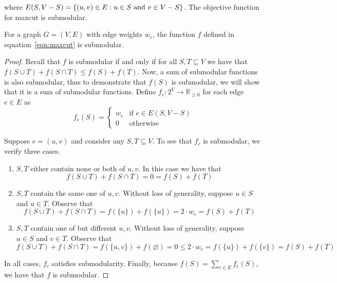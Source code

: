 \documentclass{article}
\begin{document}
where $E(S, V - S) = \{ (u, v) \in E: u \in S \textup{ and } v \in V - S \}$. The objective function for maxcut is submodular.
\begin{claim}
For a graph $G = (V, E)$ with edge weights $w_e$, the function $f$ defined in equation~\ref{eqn:maxcut} is submodular.
\end{claim}
\begin{proof}
Recall that $f$ is submodular if and only if for all $S, T \subseteq V$ we have that $f(S \cup T) + f(S \cap T) \leq f(S) + f(T)$. Now, a sum of submodular functions is also submodular, thus to demonstrate that $f(S)$ is submodular, we will show that it is a sum of submodular functions. Define $f_e: 2^V \rightarrow \mathbb{R}_{\geq 0}$ for each edge $e \in E$ as
\begin{equation*}
f_e(S) = \begin{cases}
w_e & \text{if } e \in E(S, V - S) \\
0 & \text{otherwise}
\end{cases}
\end{equation*}

Suppose $e = (u, v)$ and consider any $S, T \subseteq V$. To see that $f_e$ is submodular, we verify three cases.
\vspace{-1em}
\begin{enumerate}[1.]
\item $S, T$ either contain none or both of $u, v$. In this case we have that
\begin{equation*}
f(S \cup T) + f(S \cap T)
= 0
= f(S) + f(T)
\end{equation*}

\item $S, T$ contain the same one of $u, v$. Without loss of generality, suppose $u \in S$ and $u \in T$. Observe that
\begin{equation*}
f(S \cup T) + f(S \cap T)
= f(\{ u \}) + f(\{ u \})
= 2 \cdot w_e
= f(S) + f(T)
\end{equation*}

\item $S, T$ contain one of but different $u, v$. Without loss of generality, suppose $u \in S$ and $v \in T$. Observe that
\begin{equation*}
f(S \cup T) + f(S \cap T)
= f(\{ u, v \}) + f( \varnothing )
= 0
\leq 2 \cdot w_e
= f(\{ u \}) + f(\{ v \})
= f(S) + f(T)
\end{equation*}
\end{enumerate}

In all cases, $f_e$ satisfies submodularity. Finally, because $f(S) = \sum_{e \in E} f_e(S)$, we have that $f$ is submodular.
\end{proof}
\end{document}
